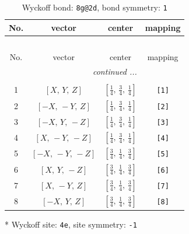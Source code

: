 \documentclass[fleqn,8pt]{jsarticle}
\begin{document}
\renewcommand{\arraystretch}{1.2}
\begin{longtable}{cccc}
\caption{Wyckoff bond: {\tt 8g@2d}, bond symmetry: {\tt 1}}
 \\
 \hline \hline
No. & vector & center & mapping \\ \hline \endfirsthead

\multicolumn{3}{l}{\tablename\ \thetable{}} \\
 \hline \hline
No. & vector & center & mapping \\ \hline \endhead

 \hline \hline
\multicolumn{3}{r}{\footnotesize\it continued ...} \\ \endfoot

 \hline \hline
\multicolumn{3}{r}{} \\ \endlastfoot

1 & $\left[ X,\, Y,\, Z \right]$ & $\left[ \frac{1}{4},\, \frac{3}{4},\, \frac{1}{4} \right]$ & {\tt [1]} \\ \hline
2 & $\left[ - X,\, - Y,\, Z \right]$ & $\left[ \frac{1}{4},\, \frac{3}{4},\, \frac{1}{4} \right]$ & {\tt [2]} \\ \hline
3 & $\left[ - X,\, Y,\, - Z \right]$ & $\left[ \frac{1}{4},\, \frac{3}{4},\, \frac{1}{4} \right]$ & {\tt [3]} \\ \hline
4 & $\left[ X,\, - Y,\, - Z \right]$ & $\left[ \frac{1}{4},\, \frac{3}{4},\, \frac{1}{4} \right]$ & {\tt [4]} \\ \hline
5 & $\left[ - X,\, - Y,\, - Z \right]$ & $\left[ \frac{3}{4},\, \frac{1}{4},\, \frac{3}{4} \right]$ & {\tt [5]} \\ \hline
6 & $\left[ X,\, Y,\, - Z \right]$ & $\left[ \frac{3}{4},\, \frac{1}{4},\, \frac{3}{4} \right]$ & {\tt [6]} \\ \hline
7 & $\left[ X,\, - Y,\, Z \right]$ & $\left[ \frac{3}{4},\, \frac{1}{4},\, \frac{3}{4} \right]$ & {\tt [7]} \\ \hline
8 & $\left[ - X,\, Y,\, Z \right]$ & $\left[ \frac{3}{4},\, \frac{1}{4},\, \frac{3}{4} \right]$ & {\tt [8]} \\
\end{longtable}
* Wyckoff site: {\tt 4e}, site symmetry: {\tt -1}
\renewcommand{\arraystretch}{1.2}
\end{document}
